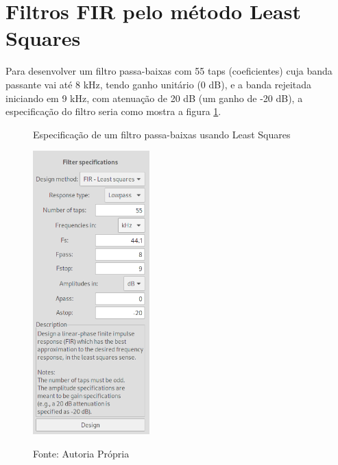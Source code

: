 \documentclass[12pt,a4paper]{report}
\begin{document}
\section{Filtros FIR pelo método Least Squares}
  Para desenvolver um filtro passa-baixas com 55 taps (coeficientes) cuja banda passante vai até 8 kHz, tendo
  ganho unitário (0 dB), e a banda rejeitada iniciando em 9 kHz, com atenuação de 20 dB (um ganho de -20 dB), a
  especificação do filtro seria como mostra a figura \ref{fig:least_squares_specifications}.
  \begin{figure}[H]
    \caption{Especificação de um filtro passa-baixas usando Least Squares}
    \centering
    \includegraphics[width=0.4\textwidth]{images/least_squares_specifications}
    \label{fig:least_squares_specifications}
    \caption*{Fonte: Autoria Própria}
  \end{figure}
  
\end{document}

